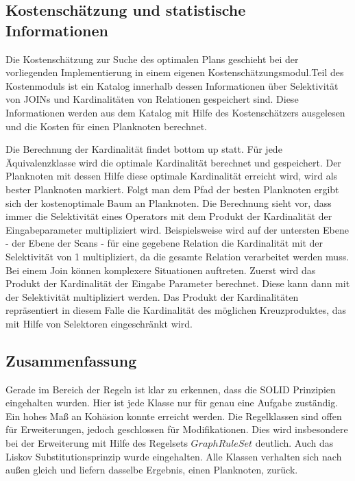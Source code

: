 \subsection{Kostenschätzung und statistische Informationen}



Die Kostenschätzung zur Suche des optimalen Plans geschieht bei der vorliegenden Implementierung in einem eigenen Kostenschätzungsmodul.Teil des Kostenmoduls ist ein Katalog innerhalb dessen Informationen über Selektivität von JOINs und Kardinalitäten von Relationen gespeichert sind. Diese Informationen werden aus dem Katalog mit Hilfe des Kostenschätzers ausgelesen und die Kosten für einen Planknoten berechnet.

Die Berechnung der Kardinalität findet bottom up statt. Für jede Äquivalenzklasse wird die optimale Kardinalität berechnet und gespeichert. Der Planknoten mit dessen Hilfe diese optimale Kardinalität erreicht wird, wird als bester Planknoten markiert. Folgt man dem Pfad der besten Planknoten ergibt sich der kostenoptimale Baum an Planknoten. Die Berechnung sieht vor, dass immer die Selektivität eines Operators mit dem Produkt der Kardinalität der Eingabeparameter multipliziert wird. Beispielsweise wird auf der untersten Ebene - der Ebene der Scans - für eine gegebene Relation die Kardinalität mit der Selektivität von 1 multipliziert, da die gesamte Relation verarbeitet werden muss. Bei einem Join können komplexere Situationen auftreten. Zuerst wird das Produkt der Kardinalität der Eingabe Parameter berechnet. Diese kann dann mit der 
Selektivität multipliziert werden. Das Produkt der Kardinalitäten repräsentiert in diesem Falle die Kardinalität des möglichen Kreuzproduktes, das mit Hilfe von Selektoren eingeschränkt wird.



\subsection{Zusammenfassung}

Gerade im Bereich der Regeln ist klar zu erkennen, dass die SOLID Prinzipien eingehalten wurden. Hier ist jede Klasse nur für genau eine Aufgabe zuständig. Ein hohes Maß an Kohäsion konnte erreicht werden. Die Regelklassen  sind offen für Erweiterungen, jedoch geschlossen für Modifikationen. Dies wird insbesondere bei der Erweiterung mit Hilfe des Regelsets $GraphRuleSet$ deutlich. Auch das Liskov Substitutionsprinzip wurde eingehalten. Alle Klassen verhalten sich nach außen gleich und liefern dasselbe Ergebnis, einen Planknoten, zurück. 